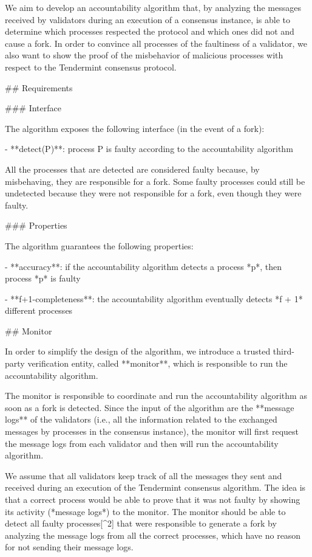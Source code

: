 \documentclass[a4paper,11pt,oneside]{report}
\begin{document}
\begin{markdown}

We aim to develop an accountability algorithm that, by analyzing the messages received by validators during an execution of a consensus instance, is able to determine which processes respected the protocol and which ones did not and cause a fork. 
In order to convince all processes of the faultiness of a validator, we also want to show the proof of the misbehavior of malicious processes with respect to the Tendermint consensus protocol.


## Requirements

### Interface

The algorithm exposes the following interface (in the event of a fork):

- **detect(P)**: process P is faulty according to the accountability algorithm

All the processes that are detected are considered faulty because, by misbehaving, they are responsible for a fork. Some faulty processes could still be undetected because they were not responsible for a fork, even though they were faulty.

### Properties

The algorithm guarantees the following properties:

- **accuracy**: if the accountability algorithm detects a process *p*, then process *p* is faulty

- **f+1-completeness**: the accountability algorithm eventually detects *f + 1* different processes

## Monitor

In order to simplify the design of the algorithm, we introduce a trusted third-party verification entity, called **monitor**, which is responsible to run the accountability algorithm.

The monitor is responsible to coordinate and run the accountability algorithm as soon as a fork is detected. Since the input of the algorithm are the **message logs** of the validators (i.e., all the information related to the exchanged messages by processes in the consensus instance), the monitor will first request the message logs from each validator and then will run the accountability algorithm.

We assume that all validators keep track of all the messages they sent and received during an execution of the Tendermint consensus algorithm. 
The idea is that a correct process would be able to prove that it was not faulty by showing its activity (*message logs*) to the monitor.
The monitor should be able to detect all faulty processes[^2] that were responsible to generate a fork by analyzing the message logs from all the correct processes, which have no reason for not sending their message logs.


\end{markdown}
\end{document}
